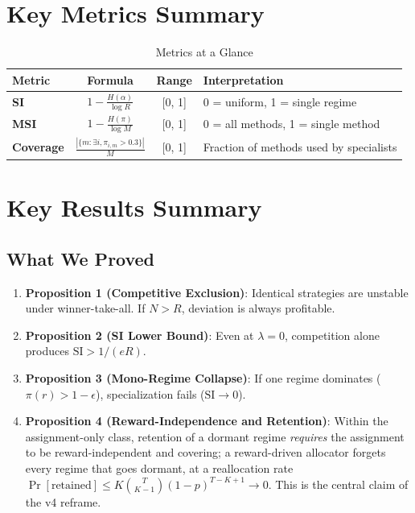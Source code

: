\documentclass[11pt,a4paper]{article}
\theoremstyle{definition}
\theoremstyle{plain}
\newcommand{\SI}{\text{SI}}
\begin{document}
\section{Key Metrics Summary}

\begin{table}[h]
\centering
\caption{Metrics at a Glance}
\begin{tabular}{l|c|c|p{6cm}}
\toprule
Metric & Formula & Range & Interpretation \\
\midrule
\textbf{SI} & $1 - \frac{H(\alpha)}{\log R}$ & [0, 1] & 0 = uniform, 1 = single regime \\
\textbf{MSI} & $1 - \frac{H(\pi)}{\log M}$ & [0, 1] & 0 = all methods, 1 = single method \\
\textbf{Coverage} & $\frac{|\{m : \exists i, \pi_{i,m} > 0.3\}|}{M}$ & [0, 1] & Fraction of methods used by specialists \\
\bottomrule
\end{tabular}
\end{table}

\section{Key Results Summary}

\subsection{What We Proved}

\begin{enumerate}
    \item \textbf{Proposition 1 (Competitive Exclusion)}: Identical strategies are unstable under winner-take-all. If $N > R$, deviation is always profitable.

    \item \textbf{Proposition 2 (SI Lower Bound)}: Even at $\lambda = 0$, competition alone produces $\SI > 1/(eR)$.

    \item \textbf{Proposition 3 (Mono-Regime Collapse)}: If one regime dominates ($\pi(r) > 1 - \epsilon$), specialization fails ($\SI \to 0$).

    \item \textbf{Proposition 4 (Reward-Independence and Retention)}: Within the assignment-only class, retention of a dormant regime \emph{requires} the assignment to be reward-independent and covering; a reward-driven allocator forgets every regime that goes dormant, at a reallocation rate $\Pr[\text{retained}] \le K\binom{T}{K-1}(1-p)^{T-K+1} \to 0$. This is the central claim of the v4 reframe.
\end{enumerate}
\end{document}
